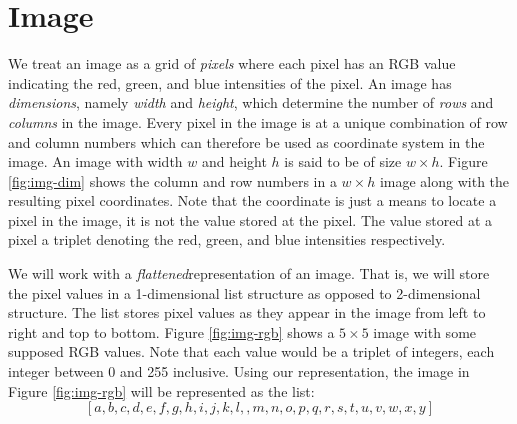 \documentclass[addpoints]{exam}
\begin{document}
\section{Image}

We treat an image as a grid of \textit{pixels} where each pixel has an RGB value indicating the red, green, and blue intensities of the pixel. An image has \textit{dimensions}, namely \textit{width} and \textit{height}, which determine the number of \textit{rows} and \textit{columns} in the image. Every pixel in the image is at a unique combination of row and column numbers which can therefore be used as coordinate system in the image. An image with width $w$ and height $h$ is said to be of size $w\times h$. Figure \ref{fig:img-dim} shows the column and row numbers in a $w\times h$ image along with the resulting pixel coordinates. Note that the coordinate is just a means to locate a pixel in the image, it is not the value stored at the pixel. The value stored at a pixel a triplet denoting the red, green, and blue intensities respectively.

We will work with a \textit{flattened}representation of an image. That is, we will store the pixel values in a 1-dimensional list structure as opposed to 2-dimensional structure. The list stores pixel values as they appear in the image from left to right and top to bottom. Figure \ref{fig:img-rgb} shows a $5\times 5$ image with some supposed RGB values. Note that each value would be a triplet of integers, each integer between 0 and 255 inclusive. Using our representation, the image in Figure \ref{fig:img-rgb} will be represented as the list:
\[
  [a, b, c, d, e, f, g, h, i, j, k, l, , m, n, o, p, q, r, s, t, u, v, w, x, y]
\]
\end{document}
